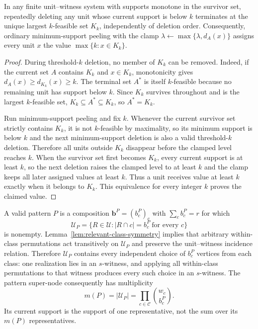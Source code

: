 \begin{lemma}
\label{lem:threshold-peeling}
In any finite unit--witness system with supports monotone in the survivor set, repeatedly deleting any unit whose current support is below $k$ terminates at the unique largest $k$-feasible set $K_k$, independently of deletion order.
%
Consequently, ordinary minimum-support peeling with the clamp $\lambda\gets\max\{\lambda,d_A(x)\}$ assigns every unit $x$ the value $\max\{k:x\in K_k\}$.
\end{lemma}
\begin{proof}
During threshold-$k$ deletion, no member of $K_k$ can be removed.
%
Indeed, if the current set $A$ contains $K_k$ and $x\in K_k$, monotonicity gives $d_A(x)\geq d_{K_k}(x)\geq k$.
%
The terminal set $A^*$ is itself $k$-feasible because no remaining unit has support below $k$.
%
Since $K_k$ survives throughout and is the largest $k$-feasible set, $K_k\subseteq A^*\subseteq K_k$, so $A^*=K_k$.

Run minimum-support peeling and fix $k$.
%
Whenever the current survivor set strictly contains $K_k$, it is not $k$-feasible by maximality, so its minimum support is below $k$ and the next minimum-support deletion is also a valid threshold-$k$ deletion.
%
Therefore all units outside $K_k$ disappear before the clamped level reaches $k$.
%
When the survivor set first becomes $K_k$, every current support is at least $k$, so the next deletion raises the clamped level to at least $k$ and the clamp keeps all later assigned values at least $k$.
%
Thus a unit receives value at least $k$ exactly when it belongs to $K_k$.
%
This equivalence for every integer $k$ proves the claimed value.
\end{proof}

A valid pattern $P$ is a composition $\mathbf b^P=(b_c^P)_c$ with $\sum_cb_c^P=r$ for which
\[
\mathcal U_P=\{R\in\mathcal U:|R\cap c|=b_c^P\ \text{for every }c\}
\]
is nonempty.
%
Lemma~\ref{lem:relevant-class-symmetry} implies that arbitrary within-class permutations act transitively on $\mathcal U_P$ and preserve the unit--witness incidence relation.
%
Therefore $\mathcal U_P$ contains every independent choice of $b_c^P$ vertices from each class: one realization lies in an $s$-witness, and applying all within-class permutations to that witness produces every such choice in an $s$-witness.
%
The pattern super-node consequently has multiplicity
\begin{equation}
\label{eq:pattern-multiplicity}
m(P)=|\mathcal U_P|=\prod_{c\in\mathcal C}\binom{w_c}{b_c^P}.
\end{equation}
Its current support is the support of one representative, not the sum over its $m(P)$ representatives.

